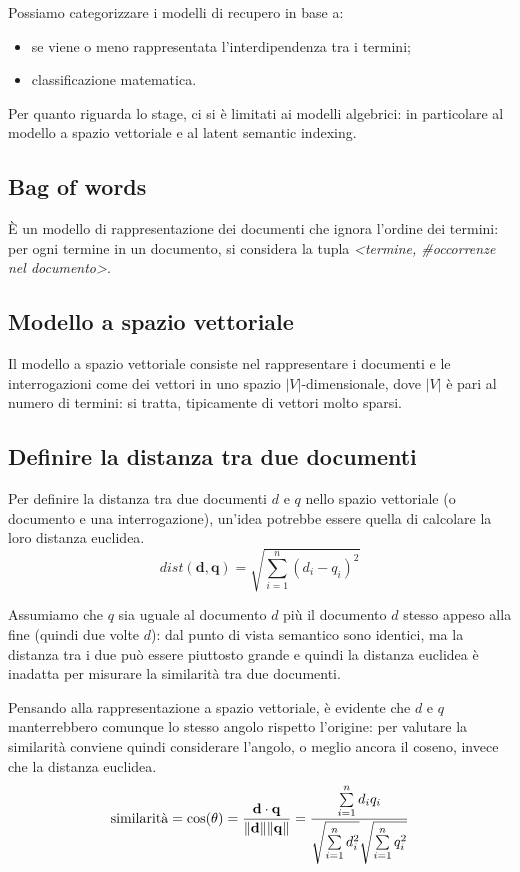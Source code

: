 Possiamo categorizzare i modelli di recupero in base a:
\begin{itemize}
    \item se viene o meno rappresentata l'interdipendenza tra i termini;
    \item classificazione matematica.
\end{itemize}

Per quanto riguarda lo stage, ci si è limitati ai modelli algebrici: in particolare al modello a spazio vettoriale e al latent semantic indexing.


\subsection{Bag of words}
È un modello di rappresentazione dei documenti che ignora l'ordine dei termini: per ogni termine in un documento, si considera la tupla \textit{<termine, \#occorrenze nel documento>}. 

\subsection{Modello a spazio vettoriale}
Il modello a spazio vettoriale consiste nel rappresentare i documenti e le interrogazioni come dei vettori in uno spazio $|V|$-dimensionale, dove $|V|$ è pari al numero di termini: si tratta, tipicamente di vettori molto sparsi.

\subsection{Definire la distanza tra due documenti}
Per definire la distanza tra due documenti $d$ e $q$ nello spazio vettoriale (o documento e una interrogazione), un'idea potrebbe essere quella di calcolare la loro distanza euclidea.
\begin{equation}
    dist(\mathbf{d},\mathbf{q}) = \sqrt{\sum_{i=1}^n {(d_i-q_i)^2}}    
\end{equation}

Assumiamo che $q$ sia uguale al documento $d$ più il documento $d$ stesso appeso alla fine (quindi due volte $d$): dal punto di vista semantico sono identici, ma la distanza tra i due può essere piuttosto grande e quindi la distanza euclidea è inadatta per misurare la similarità tra due documenti.

Pensando alla rappresentazione a spazio vettoriale, è evidente che $d$ e $q$ manterrebbero comunque lo stesso angolo rispetto l'origine: per valutare la similarità conviene quindi considerare l'angolo, o meglio ancora il coseno, invece che la distanza euclidea.
\begin{equation}
\text{similarità} = \cos(\theta) = {\mathbf{d} \cdot \mathbf{q} \over \|\mathbf{d}\| \|\mathbf{q}\|} = \frac{ \sum\limits_{i=1}^{n}{d_i  q_i} }{ \sqrt{\sum\limits_{i=1}^{n}{d_i^2}}  \sqrt{\sum\limits_{i=1}^{n}{q_i^2}}}
\end{equation}

